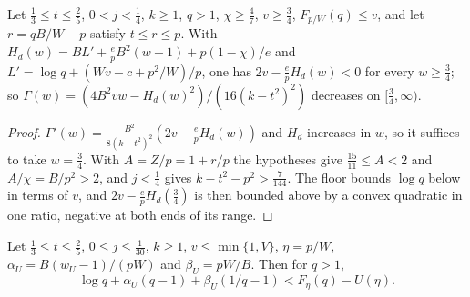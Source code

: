 \begin{lemma}\label{lem:m2-slope}
Let $\frac13\le t\le\frac25$, $0<j<\frac14$, $k\ge1$, $q>1$, $\chi\ge\frac47$, $v\ge\frac34$,
$F_{p/W}(q)\le v$, and let $r=qB/W-p$ satisfy $t\le r\le p$. With
$H_d(w)=BL'+\frac epB^2(w-1)+p(1-\chi)/e$ and $L'=\log q+(Wv-c+p^2/W)/p$, one has
$2v-\frac epH_d(w)<0$ for every $w\ge\frac34$; so $\Gamma(w)=(4B^2vw-H_d(w)^2)/(16(k-t^2)^2)$
decreases on $[\frac34,\infty)$.
\end{lemma}

\begin{proof}
$\Gamma'(w)=\frac{B^2}{8(k-t^2)^2}(2v-\frac epH_d(w))$ and $H_d$ increases in $w$, so it suffices to
take $w=\frac34$. With $A=Z/p=1+r/p$ the hypotheses give $\frac{15}{11}\le A<2$ and $A/\chi=B/p^2>2$,
and $j<\frac14$ gives $k-t^2-p^2>\frac7{144}$. The floor bounds $\log q$ below in terms of $v$, and
$2v-\frac epH_d(\frac34)$ is then bounded above by a convex quadratic in one ratio, negative at both
ends of its range.
\end{proof}

\begin{lemma}\label{lem:m2-qelim}
Let $\frac13\le t\le\frac25$, $0\le j\le\frac1{30}$, $k\ge1$, $v\le\min\{1,V\}$, $\eta=p/W$,
$\alpha_U=B(w_U-1)/(pW)$ and $\beta_U=pW/B$. Then for $q>1$,
\[
\log q+\alpha_U(q-1)+\beta_U(1/q-1)<F_\eta(q)-U(\eta).
\]
\end{lemma}

